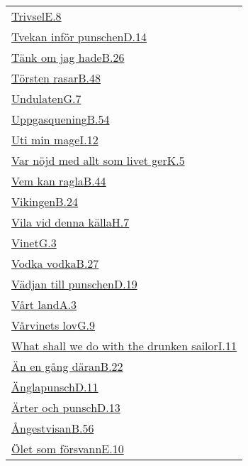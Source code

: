 \begin{longtable}[h]{@{}p{\linewidth}@{}}
  \hyperref[trivsel]{Trivsel}\dotfill\hyperref[trivsel]{E.8}\\
  \hyperref[tvekaniforpunschen]{Tvekan inför punschen}\dotfill\hyperref[tvekaniforpunschen]{D.14}\\
  \hyperref[omjaghade]{Tänk om jag hade}\dotfill\hyperref[omjaghade]{B.26}\\
  \hyperref[torstenrasar]{Törsten rasar}\dotfill\hyperref[torstenrasar]{B.48}\\
  \hyperref[undulaten]{Undulaten}\dotfill\hyperref[undulaten]{G.7}\\
  \hyperref[uppgasquening]{Uppgasquening}\dotfill\hyperref[uppgasquening]{B.54}\\
  \hyperref[utiminmage]{Uti min mage}\dotfill\hyperref[utiminmage]{I.12}\\
  \hyperref[varnojd]{Var nöjd med allt som livet ger}\dotfill\hyperref[varnojd]{K.5}\\
  \hyperref[vemkanragla]{Vem kan ragla}\dotfill\hyperref[vemkanragla]{B.44}\\
  \hyperref[vikingen]{Vikingen}\dotfill\hyperref[vikingen]{B.24}\\
  \hyperref[vilaviddennakalla]{Vila vid denna källa}\dotfill\hyperref[vilaviddennakalla]{H.7}\\
  \hyperref[vinet]{Vinet}\dotfill\hyperref[vinet]{G.3}\\
  \hyperref[vodkavodka]{Vodka vodka}\dotfill\hyperref[vodkavodka]{B.27}\\
  \hyperref[vadjantillpunschen]{Vädjan till punschen}\dotfill\hyperref[vadjantillpunschen]{D.19}\\
  \hyperref[vartland]{Vårt land}\dotfill\hyperref[vartland]{A.3}\\
  \hyperref[varvinetslov]{Vårvinets lov}\dotfill\hyperref[varvinetslov]{G.9}\\
  \hyperref[drunkensailor]{What shall we do with the drunken sailor}\dotfill\hyperref[drunkensailor]{I.11}\\
  \hyperref[anengang]{Än en gång däran}\dotfill\hyperref[anengang]{B.22}\\
  \hyperref[anglapunsch]{Änglapunsch}\dotfill\hyperref[anglapunsch]{D.11}\\
  \hyperref[arterochpunsch]{Ärter och punsch}\dotfill\hyperref[arterochpunsch]{D.13}\\
  \hyperref[angestvisan]{Ångestvisan}\dotfill\hyperref[angestvisan]{B.56}\\
  \hyperref[ohletsomforsvann]{Ölet som försvann}\dotfill\hyperref[ohletsomforsvann]{E.10}\\
\end{longtable}